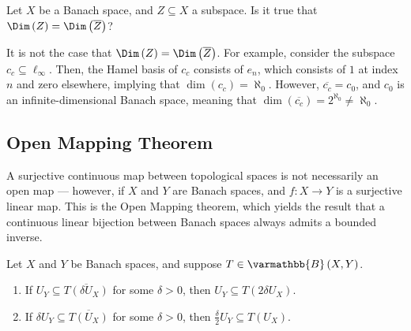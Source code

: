 \documentclass[10pt]{mypackage}
\renewcommand*{\mathbb}[1]{\varmathbb{#1}}
\newcommand{\B}{\mathbb{B}}
\begin{document}
\begin{exercise}
  Let $X$ be a Banach space, and $Z\subseteq X$ a subspace. Is it true that $\Dim\left(Z\right) = \Dim\left(\overline{Z}\right)$?
\end{exercise}
\begin{solution}
  It is not the case that $\Dim\left(Z\right) = \Dim\left(\overline{Z}\right)$. For example, consider the subspace $c_c\subseteq \ell_{\infty}$. Then, the Hamel basis of $c_c$ consists of $e_n$, which consists of $1$ at index $n$ and zero elsewhere, implying that $\dim\left(c_c\right) = \aleph_{0}$. However, $\overline{c_c} = c_0$, and $c_0$ is an infinite-dimensional Banach space, meaning that $\dim\left(\overline{c_c}\right) = 2^{\aleph_0}\neq \aleph_{0}$.
\end{solution}
\subsection{Open Mapping Theorem}%
A surjective continuous map between topological spaces is not necessarily an open map --- however, if $X$ and $Y$ are Banach spaces, and $f:X\rightarrow Y$ is a surjective linear map. This is the Open Mapping theorem, which yields the result that a continuous linear bijection between Banach spaces always admits a bounded inverse.
  \begin{lemma}
    Let $X$ and $Y$ be Banach spaces, and suppose $T\in \B\left(X,Y\right)$. 
    \begin{enumerate}[(1)]
      \item If $U_Y \subseteq \overline{T\left(\delta U_X\right)}$ for some $\delta > 0$, then $U_Y\subseteq T\left(2\delta U_X\right)$.
      \item If $\delta U_Y\subseteq \overline{T\left(U_X\right)}$ for some $\delta > 0$, then $\frac{\delta}{2}U_Y\subseteq T\left(U_X\right)$.
    \end{enumerate}
  \end{lemma}
\end{document}
